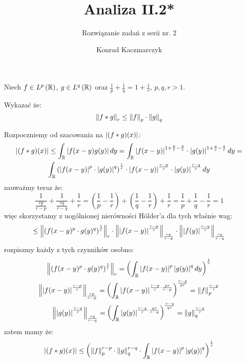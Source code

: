 \documentclass[11pt]{scrartcl}
\author{Konrad Kaczmarczyk}
\begin{document}
    \title{Analiza II.2*}
    \subtitle{Rozwiązanie zadań z serii nr. 2}
    \maketitle

    \begin{zadanie*}
        Niech $f \in L^p \left ( \mathbb R \right )$, $g \in L^q \left ( \mathbb R \right )$ oraz 
        $\frac{1}{p} + \frac{1}{q} = 1 + \frac{1}{r}$, $p,q,r > 1$. 
        
        Wykazać że:
        \[
            \left\lVert f * g \right\rVert_r \leq \left\lVert f \right\rVert_p \cdot \left\lVert g \right\rVert_q 
        \]
    \end{zadanie*}

    Rozpoczniemy od szacowania na $\left\lvert (f * g)(x) \right\rvert$:
    \begin{gather*}
        \left\lvert (f * g)(x) \right\rvert \leq \int_{\mathbb R} \left\lvert f(x - y) g(y) \right\rvert dy =
        \int_{\mathbb R} \left\lvert f(x-y) \right\rvert^{1 + \frac{p}{r} - \frac{p}{r}} 
            \cdot \left\lvert g(y) \right\rvert^{1+\frac{q}{r}-\frac{q}{r}} dy = \\
        \int_{\mathbb R} \left ( \left\lvert f(x-y) \right\rvert^p \cdot \left\lvert g(y) \right\rvert^q \right )^{\frac{1}{r}}
            \cdot \left\lvert f(x-y) \right\rvert^{\frac{r-p}{r}} \cdot \left\lvert g(y) \right\rvert^{\frac{r-q}{r}} dy
    \end{gather*}
    zauważmy teraz że:
    \[
        \frac{1}{\frac{rp}{r-p}} + \frac{1}{\frac{rq}{r-q}} + \frac{1}{r} =
        \left ( \frac{1}{p} - \frac{1}{r} \right ) + 
            \left ( \frac{1}{q} - \frac{1}{r} \right ) + \frac{1}{r} =
        \frac{1}{p} + \frac{1}{q} - \frac{1}{r} = 1
    \]
    więc skorzystamy z uogólnionej nierówności Hölder'a dla tych właśnie wag:
    \begin{gather*}
        \leq \left\lVert \left ( f(x - y)^p  \cdot g(y)^q \right )^{\frac{1}{r}} \right\rVert_r \cdot 
        \left\lVert \left\lvert f(x-y) \right\rvert^{\frac{r - p}{r}} \right\rVert_{\frac{rp}{r - p}} \cdot 
        \left\lVert \left\lvert f(y) \right\rvert^{\frac{r - q}{r}} \right\rVert_{\frac{rq}{r - q}} 
    \end{gather*}
    rozpiszmy każdy z tych czynników osobno:
    \begin{gather*}
        \left\lVert \left ( f(x - y)^p  \cdot g(y)^q \right )^{\frac{1}{r}} \right\rVert_r 
        = \left ( \int_{\mathbb R} \left\lvert f(x-y) \right\rvert^p \left\lvert g(y) \right\rvert^q dy \right )^{\frac{1}{r}}
        \\
        \left\lVert \left\lvert f(x-y) \right\rvert^{\frac{r - p}{r}} \right\rVert_{\frac{rp}{r - p}} =
        \left ( \int_{\mathbb R} \left\lvert f(x-y) \right\rvert^{\frac{r - p}{r} \cdot \frac{pr}{r-p}} \right )^
        {\frac{r-p}{pr}} =
        \left\lVert f \right\rVert^{\frac{r - p}{r}}_p
        \\
        \left\lVert \left\lvert g(y) \right\rvert^{\frac{r - q}{r}} \right\rVert_{\frac{rq}{r - q}} =
        \left ( \int_{\mathbb R} \left\lvert g(y) \right\rvert^{\frac{r - q}{r} \cdot \frac{qr}{r-q}} \right )^
        {\frac{r-q}{qr}} =
        \left\lVert g \right\rVert^{\frac{r - q}{r}}_q
    \end{gather*}
    zatem mamy że:
    \[
        \left\lvert (f * g)(x) \right\rvert \leq \left ( 
            \left\lVert f \right\rVert^{r-p}_p \cdot \left\lVert g \right\rVert^{r-q}_q 
            \cdot \int_{\mathbb R} \left\lvert f(x - y) \right\rvert^p \left\lvert g(y) \right\rvert^q  
        \right )^{\frac{1}{r}} 
    \]
\end{document}
